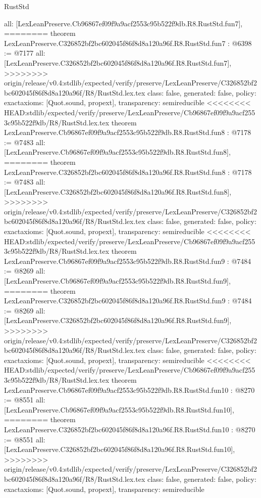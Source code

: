 \begin{lexlean}{RustStd}
\begin{coremodule}
{\begin{coremodule}
{{{{{{{{{{  all: [LexLeanPreserve.Cb96867ef09f9a9acf2553c95b522f9db.R8.RustStd.fun7],
========
theorem LexLeanPreserve.C326852bf2bc602045f86f8d8a120a96f.R8.RustStd.fun7 : @6398 := @7177 {
  all: [LexLeanPreserve.C326852bf2bc602045f86f8d8a120a96f.R8.RustStd.fun7],
>>>>>>>> origin/release/v0.4:stdlib/expected/verify/preserve/LexLeanPreserve/C326852bf2bc602045f86f8d8a120a96f/R8/RustStd.lex.tex
  class: false,
  generated: false,
  policy: exact{axioms: [Quot.sound, propext]},
  transparency: semireducible
}
<<<<<<<< HEAD:stdlib/expected/verify/preserve/LexLeanPreserve/Cb96867ef09f9a9acf2553c95b522f9db/R8/RustStd.lex.tex
theorem LexLeanPreserve.Cb96867ef09f9a9acf2553c95b522f9db.R8.RustStd.fun8 : @7178 := @7483 {
  all: [LexLeanPreserve.Cb96867ef09f9a9acf2553c95b522f9db.R8.RustStd.fun8],
========
theorem LexLeanPreserve.C326852bf2bc602045f86f8d8a120a96f.R8.RustStd.fun8 : @7178 := @7483 {
  all: [LexLeanPreserve.C326852bf2bc602045f86f8d8a120a96f.R8.RustStd.fun8],
>>>>>>>> origin/release/v0.4:stdlib/expected/verify/preserve/LexLeanPreserve/C326852bf2bc602045f86f8d8a120a96f/R8/RustStd.lex.tex
  class: false,
  generated: false,
  policy: exact{axioms: [Quot.sound, propext]},
  transparency: semireducible
}
<<<<<<<< HEAD:stdlib/expected/verify/preserve/LexLeanPreserve/Cb96867ef09f9a9acf2553c95b522f9db/R8/RustStd.lex.tex
theorem LexLeanPreserve.Cb96867ef09f9a9acf2553c95b522f9db.R8.RustStd.fun9 : @7484 := @8269 {
  all: [LexLeanPreserve.Cb96867ef09f9a9acf2553c95b522f9db.R8.RustStd.fun9],
========
theorem LexLeanPreserve.C326852bf2bc602045f86f8d8a120a96f.R8.RustStd.fun9 : @7484 := @8269 {
  all: [LexLeanPreserve.C326852bf2bc602045f86f8d8a120a96f.R8.RustStd.fun9],
>>>>>>>> origin/release/v0.4:stdlib/expected/verify/preserve/LexLeanPreserve/C326852bf2bc602045f86f8d8a120a96f/R8/RustStd.lex.tex
  class: false,
  generated: false,
  policy: exact{axioms: [Quot.sound, propext]},
  transparency: semireducible
}
<<<<<<<< HEAD:stdlib/expected/verify/preserve/LexLeanPreserve/Cb96867ef09f9a9acf2553c95b522f9db/R8/RustStd.lex.tex
theorem LexLeanPreserve.Cb96867ef09f9a9acf2553c95b522f9db.R8.RustStd.fun10 : @8270 := @8551 {
  all: [LexLeanPreserve.Cb96867ef09f9a9acf2553c95b522f9db.R8.RustStd.fun10],
========
theorem LexLeanPreserve.C326852bf2bc602045f86f8d8a120a96f.R8.RustStd.fun10 : @8270 := @8551 {
  all: [LexLeanPreserve.C326852bf2bc602045f86f8d8a120a96f.R8.RustStd.fun10],
>>>>>>>> origin/release/v0.4:stdlib/expected/verify/preserve/LexLeanPreserve/C326852bf2bc602045f86f8d8a120a96f/R8/RustStd.lex.tex
  class: false,
  generated: false,
  policy: exact{axioms: [Quot.sound, propext]},
  transparency: semireducible
}}}}}}}}}}}}}}
\end{coremodule}}
\end{coremodule}
\end{lexlean}
